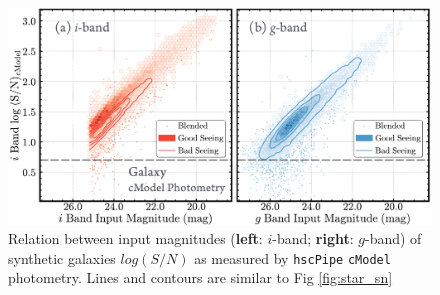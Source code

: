 \documentclass[useamsfonts]{pasj01}
\def\hscpipe{\texttt{hscPipe}}
\def\cmodel{\texttt{cModel}}
\begin{document}

\begin{figure}
    \begin{center}
        \includegraphics[width=\textwidth]{fig/synpipe_galaxy_sn}
    \end{center}
    \caption{
        Relation between input magnitudes (\textbf{left}: $i$-band; \textbf{right}:
        $g$-band) of synthetic galaxies $log(S/N)$ as measured by \hscpipe{} \cmodel{} photometry. Lines and contours are similar to Fig \ref{fig:star_sn}
        }
    \label{fig:cmodel_sn}
\end{figure}
\end{document}
